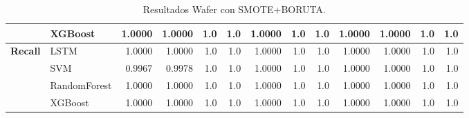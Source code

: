 \begin{table}[h]
\begin{adjustbox}{max width=15cm}
\begin{tabular}{|c|l|r|r|r|r|r|r|r|r|r|r|r|}
			& XGBoost &  1.0000 &  1.0000 &  1.0 &  1.0 &  1.0000 &  1.0 &  1.0 &  1.0000 &  1.0000 &  1.0 &  1.0 \\
			\hline
			\textbf{Recall} & LSTM &  1.0000 &  1.0000 &  1.0 &  1.0 &  1.0000 &  1.0 &  1.0 &  1.0000 &  1.0000 &  1.0 &  1.0 \\
			& SVM &  0.9967 &  0.9978 &  1.0 &  1.0 &  1.0000 &  1.0 &  1.0 &  1.0000 &  1.0000 &  1.0 &  1.0 \\
			& RandomForest &  1.0000 &  1.0000 &  1.0 &  1.0 &  1.0000 &  1.0 &  1.0 &  1.0000 &  1.0000 &  1.0 &  1.0 \\
			& XGBoost &  1.0000 &  1.0000 &  1.0 &  1.0 &  1.0000 &  1.0 &  1.0 &  1.0000 &  1.0000 &  1.0 &  1.0 \\
			\hline
		\end{tabular}
	\end{adjustbox}
	\caption{Resultados Wafer con SMOTE+BORUTA.}
	\label{tab:Wafer_SMOTE_BORUTA}
\end{table}

